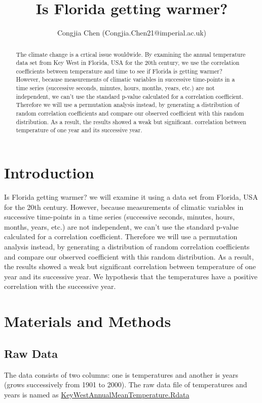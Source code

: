 \documentclass[12pt]{article}
\title{Is Florida getting warmer?}
\author{Congjia Chen (Congjia.Chen21@imperial.ac.uk)}
\begin{document}
\maketitle

\begin{abstract}
The climate change is a crtical issue wouldwide. By examining the annual temperature data set from Key West in Florida, USA for the 20th century, we use the correlation coefficients between temperature and time to see if Florida is getting warmer? However, because measurements of climatic variables in successive time-points in a time series (successive seconds, minutes, hours, months, years, etc.) are not independent, we can’t use the standard p-value calculated for a correlation coefficient. Therefore we will use a permutation analysis instead, by generating a distribution of random correlation coefficients and compare our observed coefficient with this random distribution. As a result, the results showed a weak but significant.
correlation between temperature of one year and its successive year. 

\end{abstract}

\section{Introduction}

Is Florida getting warmer? we will examine it using a data set from Florida, USA for the 20th century. However, because measurements of climatic variables in successive time-points in a time series (successive seconds, minutes, hours, months, years, etc.) are not independent, we can’t use the standard p-value calculated for a correlation coefficient. Therefore we will use a permutation analysis instead, by generating a distribution of random correlation coefficients and compare our observed coefficient with this random distribution. As a result,  the results showed a weak but significant
correlation between temperature of one year and its successive year. We hypothesis that the temperatures have a positive correlation with the successive year.

\section{Materials and Methods}

\subsection{Raw Data}
The data consists of two columns: one is temperatures and another is years (grows successively from 1901 to 2000). The raw data file of temperatures and years is named as \href{https://github.com/nedchen2/CMEECourseWork/blob/master/week3/data/KeyWestAnnualMeanTemperature.RData}{KeyWestAnnualMeanTemperature.Rdata}
\end{document}
